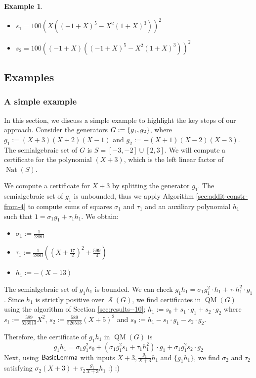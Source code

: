 \documentclass[preprint,12pt,authoryear]{elsarticle}
\newtheorem{example}[theorem]{Example}
\newenvironment{example1}
  {\begin{example}\rm}
  {\end{example}}
\DeclarePairedDelimiter{\set}{\lbrace}{\rbrace}
\DeclareMathOperator{\quadmod}{QM}
\DeclareMathOperator{\semialgebraic}{\mathcal{S}}
\DeclareMathOperator{\algBasicLemma}{\sf BasicLemma}
\DeclareMathOperator{\Nat}{Nat}
\begin{document}
\begin{example1}
\begin{enumerate}
\begin{itemize}
    \item $s_1 = 100 (X ((-1 + X)^5 - X^2 (1 + X)^3))^2$
    \item $s_2 = 100 ((-1 + X) ((-1 + X)^5 - X^2 (1 + X)^3))^2$
    \end{itemize}
  \end{enumerate}
\end{example1}

 
 \subsection{Examples}

\subsubsection{A simple example}

In this section, we discuss a simple example to highlight the key steps of our
approach. Consider the generators $G := \set{g_1, g_2}$, where
$g_1 := (X+3)(X+2)(X-1)$ and $g_2 := -(X+1)(X-2)(X-3)$. The semialgebraic set of
$G$ is $S = [-3, -2] \cup [2, 3]$. We will compute a certificate for the
polynomial $(X + 3)$, which is the left linear factor of $\Nat(S)$.

We compute a certificate for $X+3$ by splitting the generator $g_1$. The
semialgebraic set of $g_1$ is unbounded, thus we apply Algorithm
\ref{sec:addit-constr-from-4} to compute sums of squares $\sigma_1$ and $\tau_1$
and an auxiliary polynomial $h_1$ such that $1 = \sigma_1 g_1 + \tau_1 h_1$. We
obtain:

\begin{itemize}
\item $\sigma_1 := \frac{1}{2880}$
\item $\tau_1 := \frac{1}{2880}((X + \frac{17}{2})^2 + \frac{599}{4})$
\item $h_1 := -(X - 13)$
\end{itemize}

The semialgebraic set of $g_1 h_1$ is bounded. We can check 
$g_1 h_1 = \sigma_1 g_1^{2} \cdot h_1 + \tau_1 h_1^{2} \cdot g_1$. Since $h_1$
is strictly positive over $\semialgebraic(G)$, we find certificates in
$\quadmod(G)$ using the algorithm of Section \ref{sec:results--10};
$h_1 := s_0 + s_1 \cdot g_1 + s_2 \cdot g_2$ where $s_1 :=
\frac{589}{526513}X^2$, $s_2 := \frac{589}{526513}(X+5)^2$ and $s_0 := h_1 - s_1
\cdot g_1 - s_2 \cdot g_2$.

Therefore, the certificate of $g_1 h_1$ in $\quadmod(G)$ is
$$g_1 h_1 = \sigma_1 g_1^{2} s_0 +
 (\sigma_1 g_1^{2} s_1 + \tau_1 h_1^{2}) \cdot g_1
+ \sigma_1 g_1^{2} s_2 \cdot g_2$$ Next, using
$\algBasicLemma$ with inputs $X + 3, \frac{g_1}{X+3}h_1$ and $\{g_1 h_1\}$, we
find $\sigma_2$ and $\tau_2$ satisfying
$\sigma_2 (X+3) + \tau_2 \frac{g_1}{X+3} h_1$ :) :)
\end{document}
